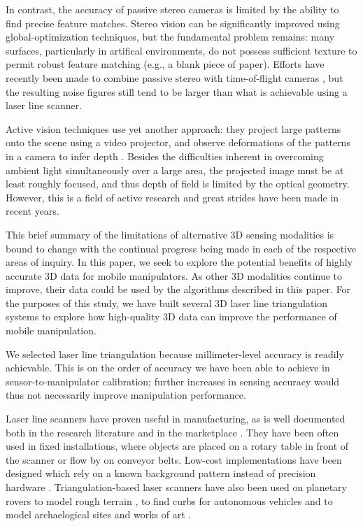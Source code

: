 \documentclass[letterpaper, 10 pt, conference]{ieeeconf}  %
\begin{document}
In contrast, the accuracy of passive stereo cameras is limited by the ability
to find precise feature matches. Stereo vision can be significantly improved
using global-optimization techniques\cite{bib:global-stereo}, but the
fundamental problem remains: many surfaces, particularly in artifical
environments, do not possess sufficient texture to permit robust feature
matching (e.g., a blank piece of paper).  Efforts have recently been made to
combine passive stereo with time-of-flight cameras \cite{bib:cam-fusion},
but the resulting noise figures still tend to be larger than what is achievable
using a laser line scanner.

Active vision techniques use yet another approach: they project large patterns
onto the scene using a video projector, and observe deformations of the
patterns in a camera to infer depth \cite{bib:active-vision}.  Besides the
difficulties inherent in overcoming ambient light simultaneously over a large
area, the projected image must be at least roughly focused, and thus depth of
field is limited by the optical geometry. However, this is a field of active
research and great strides have been made in recent years.

This brief summary of the limitations of alternative 3D sensing modalities is
bound to change with the continual progress being made in each of the
respective areas of inquiry. In this paper, we seek to explore the potential
benefits of highly accurate 3D data for mobile manipulators. As other 3D
modalities continue to improve, their data could be used by the algorithms
described in this paper. For the purposes of this study, we have built several
3D laser line triangulation systems to explore how high-quality 3D data can
improve the performance of mobile manipulation.

We selected laser line triangulation because millimeter-level accuracy
is readily achievable. This is on the order of accuracy we have been able to
achieve in sensor-to-manipulator calibration; further increases in
sensing accuracy would thus not necessarily improve manipulation
performance.


Laser line scanners have proven useful in manufacturing, as is well documented
both in the research literature \cite{bib:li-manufacturing-robot} and in the
marketplace \cite{bib:industrial-scanners}. They have been often used
in fixed installations, where objects are placed on a rotary table in
front of the scanner \cite{bib:cvpr-88} or flow by on conveyor belts.  Low-cost
implementations have been designed which rely on a known background pattern
instead of precision hardware \cite{bib:david-scanner}. Triangulation-based
laser scanners have also been used on planetary rovers to model rough terrain
\cite{bib:mars-rover}, to find curbs for autonomous vehicles
\cite{bib:curbfinder} and to model archaelogical sites and works of art
\cite{bib:levoy}.
  
\end{document}
